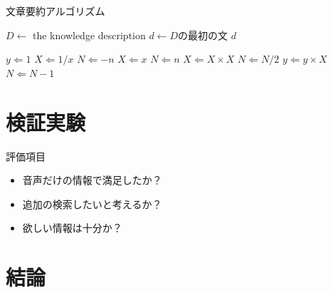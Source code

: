 \documentclass[pdflatex,ja=standard]{bxjsarticle}
\begin{document}
\begin{algorithm}
\caption{文章要約アルゴリズム}
\label{alg:summarize}
\begin{algorithmic}
    \STATE $D \leftarrow$ the knowledge description
    \STATE $d \leftarrow D$の最初の文
        \RETURN $d$
    \ENDIF

    \STATE $y \Leftarrow 1$
    \STATE $X \Leftarrow 1 / x$
    \STATE $N \Leftarrow -n$
    \ELSE
    \STATE $X \Leftarrow x$
    \STATE $N \Leftarrow n$
    \ENDIF
    \STATE $X \Leftarrow X \times X$
    \STATE $N \Leftarrow N / 2$
    \ELSE[$N$ is odd]
    \STATE $y \Leftarrow y \times X$
    \STATE $N \Leftarrow N - 1$
    \ENDIF
    \ENDWHILE
\end{algorithmic}
\end{algorithm}




\section{検証実験}

評価項目
\begin{itemize}
    \item 音声だけの情報で満足したか？
    \item 追加の検索したいと考えるか？
    \item 欲しい情報は十分か？
\end{itemize}



\section{結論}




\end{document}
